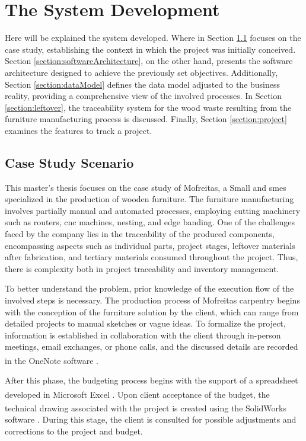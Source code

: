 \chapter{The System Development}\label{cap:development}

Here will be explained the system developed. Where in Section \ref{section:caseStudyScenario} focuses on the case study, establishing the context in which the project was initially conceived. Section \ref{section:softwareArchitecture}, on the other hand, presents the software architecture designed to achieve the previously set objectives. Additionally, Section \ref{section:dataModel} defines the data model adjusted to the business reality, providing a comprehensive view of the involved processes. In Section \ref{section:leftover}, the traceability system for the wood waste resulting from the furniture manufacturing process is discussed. Finally, Section \ref{section:project} examines the features to track a project. 

\section{Case Study Scenario}\label{section:caseStudyScenario}

This master's thesis focuses on the case study of Mofreitas, a Small and \acrfull{smes} specialized in the production of wooden furniture. The furniture manufacturing involves partially manual and automated processes, employing cutting machinery such as routers, \acrfull{cnc} machines, nesting, and edge banding. One of the challenges faced by the company lies in the traceability of the produced components, encompassing aspects such as individual parts, project stages, leftover materials after fabrication, and tertiary materials consumed throughout the project. Thus, there is complexity both in project traceability and inventory management.

To better understand the problem, prior knowledge of the execution flow of the involved steps is necessary. The production process of Mofreitas carpentry begins with the conception of the furniture solution by the client, which can range from detailed projects to manual sketches or vague ideas. To formalize the project, information is established in collaboration with the client through in-person meetings, email exchanges, or phone calls, and the discussed details are recorded in the OneNote\textsuperscript{\textregistered} software \cite{onenote}.

After this phase, the budgeting process begins with the support of a spreadsheet developed in Microsoft Excel\textsuperscript{\textregistered} \cite{excel2023}. Upon client acceptance of the budget, the technical drawing associated with the project is created using the SolidWorks\textsuperscript{\textregistered} software \cite{solidworks}. During this stage, the client is consulted for possible adjustments and corrections to the project and budget.

